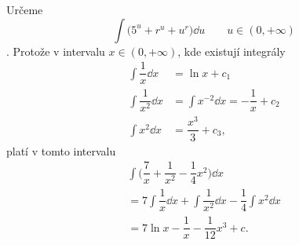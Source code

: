 \begin{mdframed}[style=mdexam]
  \begin{example}\label{MAI:exam145}
    Určeme \[\int\bigl(5^u + r^u + u^r\bigr)\dd{u}\qquad u\in(0, +\infty)\]. Protože v intervalu
    \(x\in(0, +\infty)\), kde  existují integrály
    \begin{align*}
      \int\dfrac{1}{x}\dd{x}   &= \ln x + c_1  \\
      \int\dfrac{1}{x^2}\dd{x} &= \int x^{-2}\dd{x} = -\dfrac{1}{x} + c_2  \\
      \int x^2\dd{x}           &= \dfrac{x^3}{3} + c_3 ,
    \end{align*}  
    platí v tomto intervalu
    \begin{multline*}
      \int\bigl(\dfrac{7}{x}+ \dfrac{1}{x^2} - \dfrac{1}{4}x^2\bigr)\dd{x}                        \\
          =7\int\dfrac{1}{x}\dd{x} + \int\dfrac{1}{x^2}\dd{x} - \dfrac{1}{4}\int x^2\dd{x}        \\
          =7\ln x - \dfrac{1}{x} - \dfrac{1}{12}x^3 + c.
    \end{multline*}
  \end{example}
\end{mdframed}